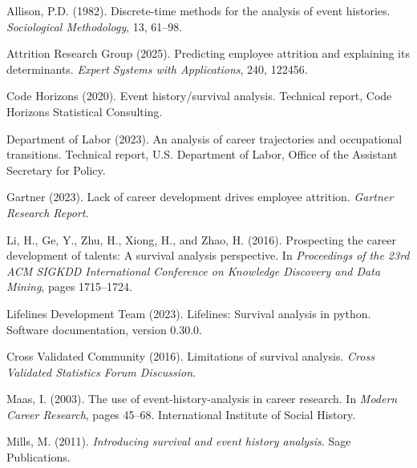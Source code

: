 \documentclass[../main.tex]{subfiles}
\begin{document}
\begin{thebibliography}{40}

Allison, P.D. (1982).
\newblock Discrete-time methods for the analysis of event histories.
\newblock \emph{Sociological Methodology}, 13, 61--98.

Attrition Research Group (2025).
\newblock Predicting employee attrition and explaining its determinants.
\newblock \emph{Expert Systems with Applications}, 240, 122456.

Code Horizons (2020).
\newblock Event history/survival analysis.
\newblock Technical report, Code Horizons Statistical Consulting.

Department of Labor (2023).
\newblock An analysis of career trajectories and occupational transitions.
\newblock Technical report, U.S. Department of Labor, Office of the Assistant Secretary for Policy.

Gartner (2023).
\newblock Lack of career development drives employee attrition.
\newblock \emph{Gartner Research Report}.

Li, H., Ge, Y., Zhu, H., Xiong, H., and Zhao, H. (2016).
\newblock Prospecting the career development of talents: A survival analysis perspective.
\newblock In \emph{Proceedings of the 23rd ACM SIGKDD International Conference on Knowledge Discovery and Data Mining}, pages 1715--1724.

Lifelines Development Team (2023).
\newblock Lifelines: Survival analysis in python.
\newblock Software documentation, version 0.30.0.

Cross Validated Community (2016).
\newblock Limitations of survival analysis.
\newblock \emph{Cross Validated Statistics Forum Discussion}.

Maas, I. (2003).
\newblock The use of event-history-analysis in career research.
\newblock In \emph{Modern Career Research}, pages 45--68. International Institute of Social History.

Mills, M. (2011).
\newblock \emph{Introducing survival and event history analysis}.
\newblock Sage Publications.


\end{thebibliography}
\end{document}
